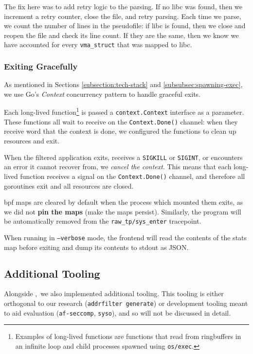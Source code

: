 The fix here was to add retry logic to the parsing. If no \ac{libc} was found,
then we increment a retry counter, close the file, and retry parsing. Each time
we parse, we count the number of lines in the pseudofile: if \ac{libc} is found,
then we close and reopen the file and check its line count. If they are the
same, then we know we have accounted for every \texttt{vma\_struct} that was
mapped to \ac{libc}.


\subsubsection{Exiting Gracefully}

As mentioned in Sections \ref{subsection:tech-stack} and 
\ref{subsubsec:spawning-exec}, we use Go's \textit{Context} concurrency pattern
to handle graceful exits. 

Each long-lived function\footnote{Examples of long-lived functions are functions
that read from ringbuffers in an infinite loop and child processes spawned using
\texttt{os/exec}.} is passed a \texttt{context.Context} interface as a
parameter. These functions all wait to receive on the \texttt{Context.Done()}
channel: when they receive word that the context is done, we configured the
functions to clean up resources and exit. 

When the filtered application exits, receives a \texttt{SIGKILL} or 
\texttt{SIGINT}, or \af encounters an error it cannot recover from, we 
\textit{cancel the context}. This means that each long-lived function receives 
a signal on the \texttt{Context.Done()} channel, and therefore all goroutines 
exit and all resources are closed.

\ac{bpf} maps are cleared by default when the process which mounted them exits,
as we did not \textbf{pin the maps} (make the maps persist). Similarly, the \af
program will be automatically removed from the \texttt{raw\_tp/sys\_enter}
tracepoint.

When running in \texttt{--verbose} mode, the frontend will read the contents of
the stats map before exiting and dump its contents to \ac{stdout} as JSON.

\subsection{Additional Tooling}

Alongside \afss,~we also implemented additional tooling. This tooling is either
orthogonal to our research (\texttt{addrfilter generate}) or development tooling
meant to aid evaluation (\texttt{af-seccomp}, \texttt{syso}), and so will not be
discussed in detail. 

